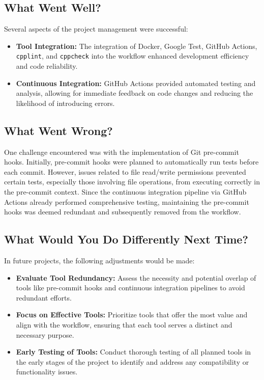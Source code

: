 \documentclass{article}
\begin{document}
\subsection{What Went Well?}

Several aspects of the project management were successful:

\begin{itemize}
    \item \textbf{Tool Integration:} The integration of Docker, Google Test,
    GitHub Actions, \texttt{cpplint}, and \texttt{cppcheck} into the workflow
    enhanced development efficiency and code reliability.
    \item \textbf{Continuous Integration:} GitHub Actions provided automated
    testing and analysis, allowing for immediate feedback on code changes and
    reducing the likelihood of introducing errors.
\end{itemize}

\subsection{What Went Wrong?}

One challenge encountered was with the implementation of Git pre-commit hooks.
Initially, pre-commit hooks were planned to automatically run tests before each
commit. However, issues related to file read/write permissions prevented certain
tests, especially those involving file operations, from executing correctly in
the pre-commit context. Since the continuous integration pipeline via GitHub
Actions already performed comprehensive testing, maintaining the pre-commit
hooks was deemed redundant and subsequently removed from the workflow.

\subsection{What Would You Do Differently Next Time?}

In future projects, the following adjustments would be made:

\begin{itemize}
    \item \textbf{Evaluate Tool Redundancy:} Assess the necessity and potential
    overlap of tools like pre-commit hooks and continuous integration pipelines
    to avoid redundant efforts.
    \item \textbf{Focus on Effective Tools:} Prioritize tools that offer the
    most value and align with the workflow, ensuring that each tool serves a
    distinct and necessary purpose.
    \item \textbf{Early Testing of Tools:} Conduct thorough testing of all
    planned tools in the early stages of the project to identify and address any
    compatibility or functionality issues.
\end{itemize}
\end{document}
